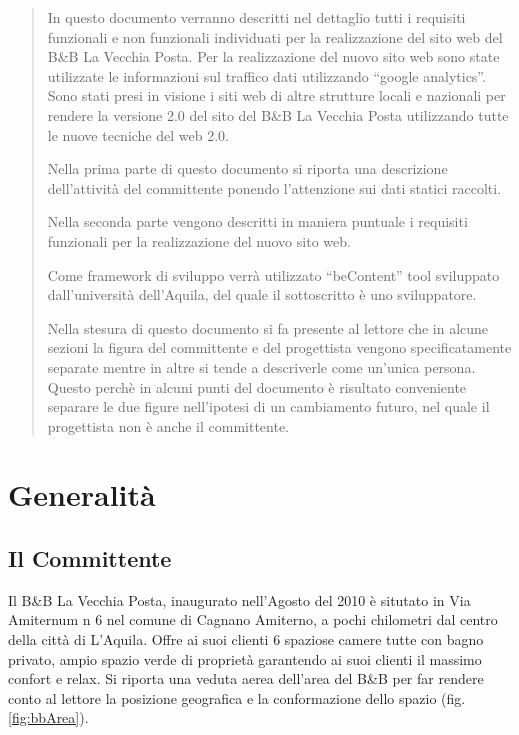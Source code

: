 \documentclass[a4paper,12pt,hidelinks]{report}
\begin{document}
\begin{abstract}
  In questo documento verranno descritti nel dettaglio tutti i requisiti funzionali e non funzionali individuati per la realizzazione del sito web del B\&B La Vecchia Posta.
  Per la realizzazione del nuovo sito web sono state utilizzate le informazioni sul traffico dati utilizzando ``google analytics''. Sono stati presi in visione i siti web di altre strutture
  locali e nazionali per rendere la versione 2.0 del sito del B\&B La Vecchia Posta utilizzando tutte le nuove tecniche del web 2.0.
  \par Nella prima parte di questo documento si riporta una descrizione dell'attività del committente ponendo l'attenzione sui dati statici raccolti.
  \par Nella seconda parte vengono descritti in maniera puntuale i requisiti funzionali per la realizzazione del nuovo sito web.
  \par Come framework di sviluppo verrà utilizzato ``beContent'' tool sviluppato dall'università dell'Aquila, del quale il sottoscritto è uno sviluppatore.
  \par Nella stesura di questo documento si fa presente al lettore che in alcune sezioni la figura del committente e del progettista vengono specificatamente separate mentre in altre si tende a 
  descriverle come un'unica persona. Questo perchè in alcuni punti del documento è risultato conveniente separare le due figure nell'ipotesi di un cambiamento futuro, nel quale il progettista 
  non è anche il committente.
\end{abstract}

\chapter{Generalità}

\section{Il Committente}
  Il B\&B La Vecchia Posta, inaugurato nell'Agosto del 2010 è situtato in Via Amiternum n 6 nel comune di Cagnano Amiterno, a pochi chilometri dal centro della città di L'Aquila.
  Offre ai suoi clienti 6 spaziose camere tutte con bagno privato, ampio spazio verde di proprietà garantendo ai suoi clienti il massimo confort e relax. 
  Si riporta una veduta aerea dell'area del B\&B per far rendere conto al lettore la posizione geografica e la conformazione dello spazio (fig.\ref{fig:bbArea}). 
\end{document}
